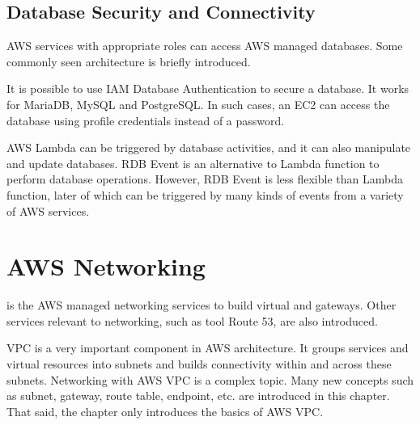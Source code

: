 \subsection{Database Security and Connectivity}

AWS services with appropriate roles can access AWS managed databases. Some commonly seen architecture is briefly introduced.

It is possible to use IAM Database Authentication to secure a database. It works for MariaDB, MySQL and PostgreSQL. In such cases, an EC2 can access the database using profile credentials instead of a password.

AWS Lambda can be triggered by database activities, and it can also manipulate and update databases. RDB Event is an alternative to Lambda function to perform database operations. However, RDB Event is less flexible than Lambda function, later of which can be triggered by many kinds of events from a variety of AWS services. 

\section{AWS Networking}

 is the AWS managed networking services to build virtual  and gateways. Other services relevant to networking, such as  tool Route 53, are also introduced.

VPC is a very important component in AWS architecture. It groups services and virtual resources into subnets and builds connectivity within and across these subnets. Networking with AWS VPC is a complex topic. Many new concepts such as subnet, gateway, route table, endpoint, etc. are introduced in this chapter. That said, the chapter only introduces the basics of AWS VPC.

